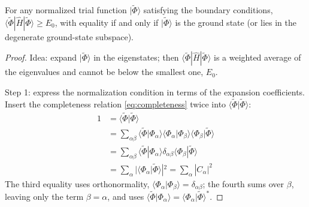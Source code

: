 \begin{theorem}
For any normalized trial function $|\tilde{\Phi}\rangle$ satisfying the boundary conditions, $\langle\tilde{\Phi}|\hat{H}|\tilde{\Phi}\rangle \ge E_0$, with equality if and only if $|\tilde{\Phi}\rangle$ is the ground state (or lies in the degenerate ground-state subspace).
\end{theorem}

\begin{proof}
Idea: expand $|\tilde{\Phi}\rangle$ in the eigenstates; then $\langle\tilde{\Phi}|\hat{H}|\tilde{\Phi}\rangle$ is a weighted average of the eigenvalues and cannot be below the smallest one, $E_0$.

Step 1: express the normalization condition in terms of the expansion coefficients. Insert the completeness relation \eqref{eq:completeness} twice into $\langle\tilde{\Phi}|\tilde{\Phi}\rangle$:
\begin{align*}
1 &= \langle\tilde{\Phi}|\tilde{\Phi}\rangle \\
&= \sum_{\alpha \beta} \langle\tilde{\Phi}|\Phi_\alpha\rangle\langle\Phi_\alpha|\Phi_\beta\rangle\langle\Phi_\beta|\tilde{\Phi}\rangle \\
&= \sum_{\alpha \beta} \langle\tilde{\Phi}|\Phi_\alpha\rangle \delta_{\alpha \beta} \langle\Phi_\beta|\tilde{\Phi}\rangle \\
&= \sum_{\alpha} |\langle\Phi_\alpha|\tilde{\Phi}\rangle|^2 = \sum_{\alpha} |C_\alpha|^2
\end{align*}
The third equality uses orthonormality, $\langle \Phi_\alpha | \Phi_\beta \rangle = \delta_{\alpha\beta}$; the fourth sums over $\beta$, leaving only the term $\beta = \alpha$, and uses $\langle\tilde{\Phi}|\Phi_\alpha\rangle = \langle\Phi_\alpha|\tilde{\Phi}\rangle^*$.


\end{proof}
